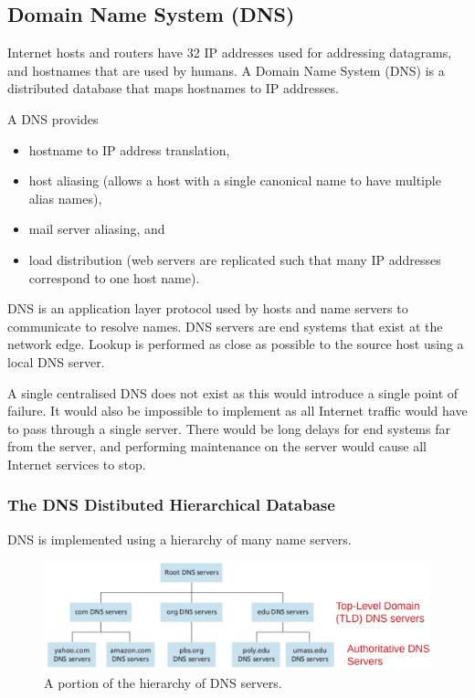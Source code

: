 \subsection{Domain Name System (DNS)}

Internet hosts and routers have \SI{32}{\bit} IP addresses used for addressing datagrams, and hostnames that are used by humans.
A Domain Name System (DNS) is a distributed database that maps hostnames to IP addresses.

A DNS provides
\begin{itemize}
  \item hostname to IP address translation,
  \item host aliasing (allows a host with a single canonical name to have multiple alias names),
  \item mail server aliasing, and
  \item load distribution (web servers are replicated such that many IP addresses correspond to one host name).
\end{itemize}

DNS is an application layer protocol used by hosts and name servers to communicate to resolve names.
DNS servers are end systems that exist at the network edge.
Lookup is performed as close as possible to the source host using a local DNS server.

A single centralised DNS does not exist as this would introduce a single point of failure.
It would also be impossible to implement as all Internet traffic would have to pass through a single server.
There would be long delays for end systems far from the server, and performing maintenance on the server would cause all Internet services to stop.

\subsubsection{The DNS Distibuted Hierarchical Database}

DNS is implemented using a hierarchy of many name servers.

\begin{figure}[htp]
  \centering
  \includegraphics[width=15cm]{unit-17/figures/dns-hierarchy.png}
  \caption*{A portion of the hierarchy of DNS servers.}
\end{figure}

